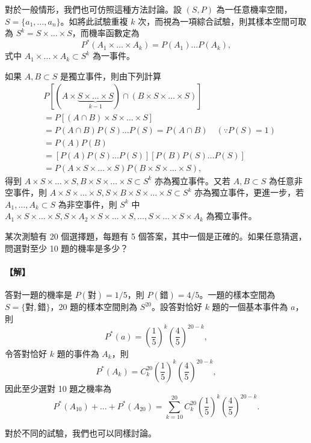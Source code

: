 對於一般情形，我們也可仿照這種方法討論。設 $(S, P)$ 為一任意機率空間，$S = \{a_1, \dots, a_n\}$。如將此試驗重複 $k$ 次，而視為一項綜合試驗，則其樣本空間可取為 $S^k = S \times \dots \times S$，而機率函數定為
\[
P^*(A_1 \times \dots \times A_k) = P(A_1) \dots P(A_k),
\]
式中 $A_1 \times \dots \times A_k \subset S^k$ 為一事件。

如果 $A, B \subset S$ 是獨立事件，則由下列計算
\begin{align*}
& P[(A \times \underbrace{S \times \dots \times S}_{k-1}) \cap (B \times S \times \dots \times S)] \\
&= P[(A \cap B) \times S \times \dots \times S] \\
&= P(A \cap B) P(S) \dots P(S) = P(A \cap B) \quad (\because P(S) = 1) \\
&= P(A)P(B) \\
&= [P(A) P(S) \dots P(S)][P(B) P(S) \dots P(S)] \\
&= P(A \times S \times \dots \times S) P(B \times S \times \dots \times S),
\end{align*}
得到 $A \times S \times \dots \times S, B \times S \times \dots \times S \subset S^k$ 亦為獨立事件。又若 $A, B \subset S$ 為任意非空事件，則 $A \times S \times \dots \times S, S \times B \times S \times \dots \times S \subset S^k$ 亦為獨立事件，更進一步，若 $A_1, \dots, A_k \subset S$ 為非空事件，則 $S^k$ 中 $A_1 \times S \times \dots \times S, S \times A_2 \times S \times \dots \times S, \dots, S \times \dots \times S \times A_k$ 為獨立事件。

\medskip
\begin{example}\label{ex:b5s-4-16}
某次測驗有 20 個選擇題，每題有 5 個答案，其中一個是正確的。如果任意猜選，問選對至少 10 題的機率是多少？
\end{example}
\paragraph{【解】}
答對一題的機率是 $P(\text{對}) = 1/5$，則 $P(\text{錯}) = 4/5$。一題的樣本空間為 $S = \{\text{對}, \text{錯}\}$，20 題的樣本空間則為 $S^{20}$。設答對恰好 $k$ 題的一個基本事件為 $a$，則
\[
P^*(a) = \left(\frac{1}{5}\right)^k \left(\frac{4}{5}\right)^{20-k},
\]
令答對恰好 $k$ 題的事件為 $A_k$，則
\[
P^*(A_k) = C^{20}_k \left(\frac{1}{5}\right)^k \left(\frac{4}{5}\right)^{20-k},
\]
因此至少選對 10 題之機率為
\[
P^*(A_{10}) + \dots + P^*(A_{20}) = \sum_{k=10}^{20} C^{20}_k \left(\frac{1}{5}\right)^k \left(\frac{4}{5}\right)^{20-k}. \tag*{\#}
\]

對於不同的試驗，我們也可以同樣討論。

